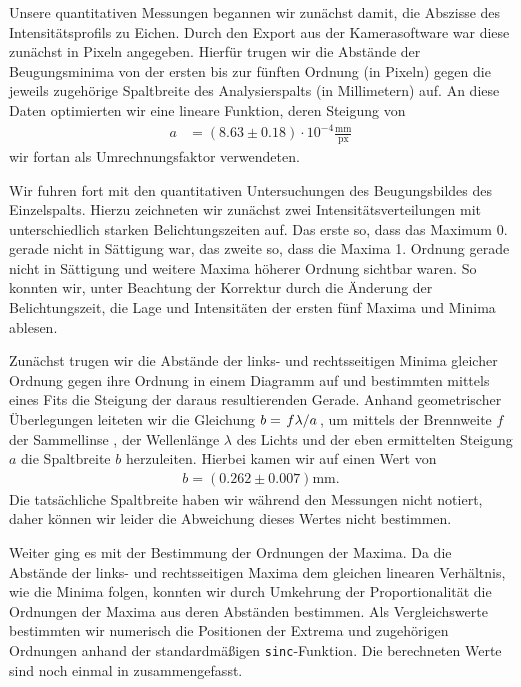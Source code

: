 Unsere quantitativen Messungen begannen wir zunächst damit, die Abszisse des Intensitätsprofils zu Eichen. Durch den Export aus der Kamerasoftware war diese zunächst in Pixeln angegeben. Hierfür trugen wir die Abstände der Beugungsminima von der ersten bis zur fünften Ordnung (in Pixeln) gegen die jeweils zugehörige Spaltbreite des Analysierspalts (in Millimetern) auf. An diese Daten optimierten wir eine lineare Funktion, deren Steigung von
\begin{align*}
  a &= (8.63 \pm 0.18) \cdot 10^{-4} \frac{\si{\milli\meter}}{\mathrm{px}}
\end{align*}
wir fortan als Umrechnungsfaktor verwendeten.

Wir fuhren fort mit den quantitativen Untersuchungen des Beugungsbildes des Einzelspalts. Hierzu zeichneten wir zunächst zwei Intensitätsverteilungen mit unterschiedlich starken Belichtungszeiten auf. Das erste so, dass das Maximum 0. gerade nicht in Sättigung war, das zweite so, dass die Maxima 1. Ordnung gerade nicht in Sättigung und weitere Maxima höherer Ordnung sichtbar waren. So konnten wir, unter Beachtung der Korrektur durch die Änderung der Belichtungszeit, die Lage und Intensitäten der ersten fünf Maxima und Minima ablesen.

Zunächst trugen wir die Abstände der links- und rechtsseitigen Minima gleicher Ordnung gegen ihre Ordnung in einem Diagramm auf und bestimmten mittels eines Fits die Steigung der daraus resultierenden Gerade. Anhand geometrischer Überlegungen leiteten wir die Gleichung $b = \ffrac{f\lambda}{a}$, um mittels der Brennweite $f$ der Sammellinse , der Wellenlänge $\lambda$ des Lichts und der eben ermittelten Steigung $a$ die Spaltbreite $b$ herzuleiten. Hierbei kamen wir auf einen Wert von 
\begin{align}
  b = (0.262 \pm 0.007)\si{\milli\meter}.
\end{align}
Die tatsächliche Spaltbreite haben wir während den Messungen nicht notiert, daher können wir leider die Abweichung dieses Wertes nicht bestimmen.

Weiter ging es mit der Bestimmung der Ordnungen der Maxima. Da die Abstände der links- und rechtsseitigen Maxima dem gleichen linearen Verhältnis, wie die Minima folgen, konnten wir durch Umkehrung der Proportionalität die Ordnungen der Maxima aus deren Abständen bestimmen. Als Vergleichswerte bestimmten wir numerisch die Positionen der Extrema und zugehörigen Ordnungen anhand der standardmäßigen \texttt{sinc}-Funktion. Die berechneten Werte sind noch einmal in  zusammengefasst.


